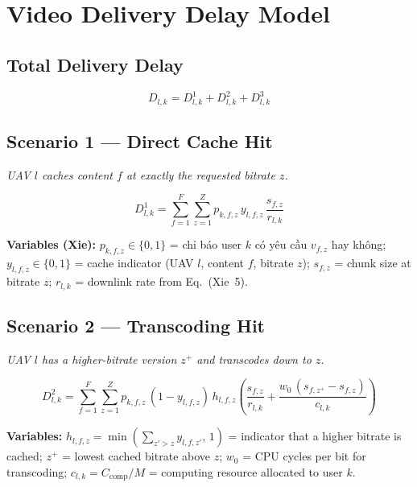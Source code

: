 \documentclass[11pt,a4paper]{article}
\begin{document}
\section{Video Delivery Delay Model}

\subsection{Total Delivery Delay}

\begin{equation}
  D_{l,k} = D_{l,k}^1 + D_{l,k}^2 + D_{l,k}^3
  \tag{Xie~13}
\end{equation}

\subsection{Scenario 1 — Direct Cache Hit}
\emph{UAV $l$ caches content $f$ at exactly the requested bitrate $z$.}

\begin{equation}
  D_{l,k}^1 = \sum_{f=1}^{F}\sum_{z=1}^{Z}
    p_{k,f,z}\, y_{l,f,z}\, \frac{s_{f,z}}{r_{l,k}}
  \tag{Xie~10}
\end{equation}

\noindent \textbf{Variables (Xie):}
$p_{k,f,z} \in \{0,1\}$ = chỉ báo user $k$ có yêu cầu $v_{f,z}$ hay không;
$y_{l,f,z} \in \{0,1\}$ = cache indicator (UAV $l$, content $f$, bitrate $z$);
$s_{f,z}$ = chunk size at bitrate $z$;
$r_{l,k}$ = downlink rate from Eq.~(Xie~5).

\subsection{Scenario 2 — Transcoding Hit}
\emph{UAV $l$ has a higher-bitrate version $z^+$ and transcodes down to $z$.}

\begin{equation}
  D_{l,k}^2 = \sum_{f=1}^{F}\sum_{z=1}^{Z}
    p_{k,f,z}\,(1 - y_{l,f,z})\, h_{l,f,z}
    \left(\frac{s_{f,z}}{r_{l,k}} + \frac{w_0\,(s_{f,z^+} - s_{f,z})}{c_{l,k}}\right)
  \tag{Xie~11}
\end{equation}

\noindent \textbf{Variables:}
$h_{l,f,z} = \min\!\left(\sum_{z'>z} y_{l,f,z'},\,1\right)$ = indicator that a higher bitrate is cached;
$z^+$ = lowest cached bitrate above $z$;
$w_0$ = CPU cycles per bit for transcoding;
$c_{l,k} = C_{\mathrm{comp}} / M$ = computing resource allocated to user $k$.
\end{document}
